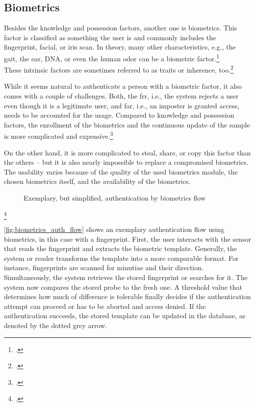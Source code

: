 \subsection{Biometrics}

Besides the knowledge and possession factors, another one is biometrics. This factor is classified as \frqq something the user is\flqq{} and commonly includes the fingerprint, facial, or iris scan. In theory, many other characteristics, e.g., the gait, the ear, DNA, or even the human odor can be a biometric factor.\footcite[See][30--34]{Jain2011}\\
These intrinsic factors are sometimes referred to as traits or inherence, too.\footcite[See][186]{dasgupta2017multi}

While it seems natural to authenticate a person with a biometric factor, it also comes with a couple of challenges. Both, the \gls{frr}, i.e., the system rejects a user even though it is a legitimate user, and \gls{far}, i.e., an imposter is granted access, needs to be accounted for the usage. Compared to knowledge and possession factors, the enrollment of the biometrics and the continuous update of the sample is more complicated and expensive.\footcites[See][18--24]{Jain2011}[See][34--37]{265831}

On the other hand, it is more complicated to steal, share, or copy this factor than the others -- but it is also nearly impossible to replace a compromised biometrics. The usability varies because of the quality of the used biometrics module, the chosen biometrics itself, and the availability of the biometrics.

\begin{figure}[hbt]
	\centering
	
	\caption[Exemplary, but simplified, authentication by biometrics flow]{Exemplary, but simplified, authentication by biometrics flow\footnotemark}
	\label{fig:biometrics_auth_flow}
\end{figure}
\footcitetext[Source: diagram by author, based on][11]{Jain2011}

\autoref{fig:biometrics_auth_flow} shows an exemplary authentication flow using biometrics, in this case with a fingerprint. First, the user interacts with the sensor that reads the fingerprint and extracts the biometric template. Generally, the system or reader transforms the template into a more comparable format. For instance, fingerprints are scanned for minutiae and their direction. Simultaneously, the system retrieves the stored fingerprint or searches for it. The system now compares the stored probe to the fresh one. A threshold value that determines how much of difference is tolerable finally decides if the authentication attempt can proceed or has to be aborted and access denied. If the authentication succeeds, the stored template can be updated in the database, as denoted by the dotted grey arrow.

